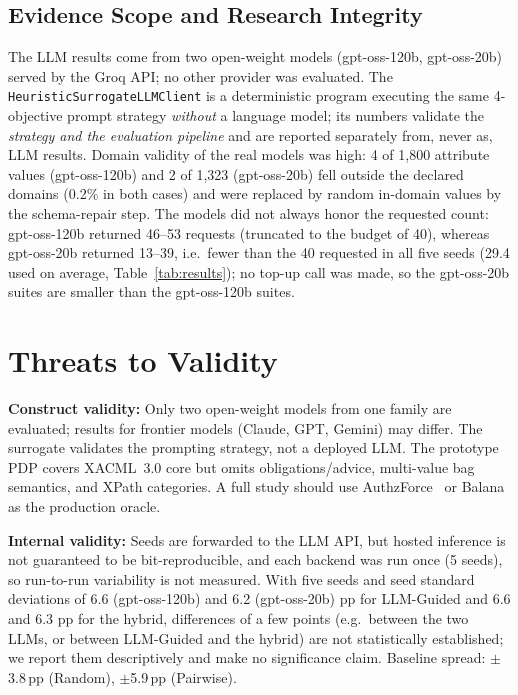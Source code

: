 \documentclass[conference]{IEEEtran}
\begin{document}
\subsection{Evidence Scope and Research Integrity}

The LLM results come from two open-weight models (gpt-oss-120b, gpt-oss-20b)
served by the Groq API; no other provider was evaluated. The
\texttt{HeuristicSurrogateLLMClient} is a deterministic program executing the
same 4-objective prompt strategy \textit{without} a language model; its numbers
validate the \textit{strategy and the evaluation pipeline} and are reported
separately from, never as, LLM results. Domain validity of the real models was high: 4 of 1,800 attribute values
(gpt-oss-120b) and 2 of 1,323 (gpt-oss-20b) fell outside the declared domains
(0.2\% in both cases) and were replaced by random in-domain values by the
schema-repair step. The models did not always honor the requested count:
gpt-oss-120b returned 46--53 requests (truncated to the budget of 40), whereas
gpt-oss-20b returned 13--39, i.e.\ fewer than the 40 requested in all five
seeds (29.4 used on average, Table~\ref{tab:results}); no top-up call was made,
so the gpt-oss-20b suites are smaller than the gpt-oss-120b suites.

\section{Threats to Validity}
\label{sec:threats}

\textbf{Construct validity:} Only two open-weight models from one family are
evaluated; results for frontier models (Claude, GPT, Gemini) may differ. The
surrogate validates the prompting strategy, not a deployed LLM. The prototype
PDP covers XACML~3.0 core but omits obligations/advice, multi-value bag
semantics, and XPath categories. A full study should use AuthzForce~\cite{b17}
or Balana~\cite{b18} as the production oracle.

\textbf{Internal validity:} Seeds are forwarded to the LLM API, but hosted
inference is not guaranteed to be bit-reproducible, and each backend was
run once (5 seeds), so run-to-run variability is not measured.
With five seeds and seed standard deviations of 6.6 (gpt-oss-120b) and 6.2
(gpt-oss-20b) pp for LLM-Guided and 6.6 and 6.3 pp for the hybrid, differences
of a few points (e.g.\ between the two LLMs, or between LLM-Guided and the
hybrid) are not statistically established; we report them descriptively and
make no significance claim.
Baseline spread: $\pm$3.8\,pp (Random), $\pm$5.9\,pp (Pairwise).
\end{document}
